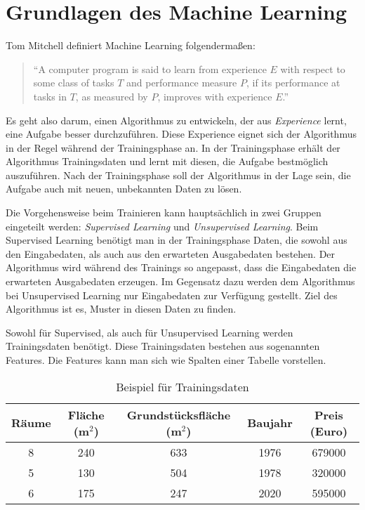 
\chapter{Grundlagen des Machine Learning}

Tom Mitchell definiert Machine Learning folgendermaßen:
\begin{quote}
    \enquote{A computer program is said to learn from experience $E$ with respect to some class of tasks $T$ and performance measure $P$, if its performance at tasks in $T$, as measured by $P$, improves with experience $E$.} \cite{mitchell1997}
\end{quote}

Es geht also darum, einen Algorithmus zu entwickeln, der aus \textit{Experience} lernt, eine Aufgabe besser durchzuführen. Diese Experience eignet sich der Algorithmus in der Regel während der Trainingsphase an. In der Trainingsphase erhält der Algorithmus Trainingsdaten und lernt mit diesen, die Aufgabe bestmöglich auszuführen. Nach der Trainingsphase soll der Algorithmus in der Lage sein, die Aufgabe auch mit neuen, unbekannten Daten zu lösen.

Die Vorgehensweise beim Trainieren kann hauptsächlich in zwei Gruppen eingeteilt werden: \textit{Supervised Learning} und \textit{Unsupervised Learning}. Beim Supervised Learning benötigt man in der Trainingsphase Daten, die sowohl aus den Eingabedaten, als auch aus den erwarteten Ausgabedaten bestehen. Der Algorithmus wird während des Trainings so angepasst, dass die Eingabedaten die erwarteten Ausgabedaten erzeugen. Im Gegensatz dazu werden dem Algorithmus bei Unsupervised Learning nur Eingabedaten zur Verfügung gestellt. Ziel des Algorithmus ist es, Muster in diesen Daten zu finden.

Sowohl für Supervised, als auch für Unsupervised Learning werden Trainingsdaten benötigt. Diese Trainingsdaten bestehen aus sogenannten Features. Die Features kann man sich wie Spalten einer Tabelle vorstellen.

\begin{table}[H]
    \centering
    \begin{tabular}{ || c | c | c | c || c || }
        \hline
        Räume & Fläche (m$^2$) & Grundstücksfläche (m$^2$) & Baujahr & Preis (Euro) \\
        \hline
        8 & 240 & 633 & 1976 & 679000 \\
        5 & 130 & 504 & 1978 & 320000 \\
        6 & 175 & 247 & 2020 & 595000 \\
        \hline
    \end{tabular}
    \caption{Beispiel für Trainingsdaten}
    \label{tbl:trainingdata}
\end{table}

